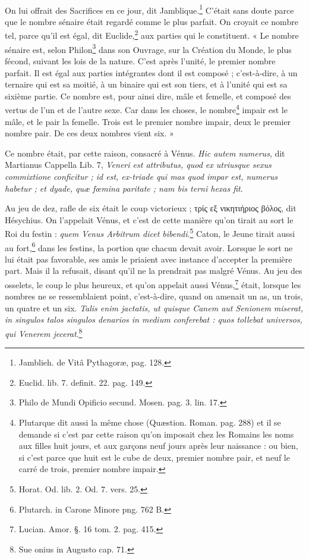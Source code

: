 \documentclass[a4paper, 11pt, oneside, polutonikogreek, french]{article}
\begin{document}
\paragraph{}
On lui offrait des Sacrifices en ce jour, dit Jamblique.\footnote{Jamblieh. de Vitâ Pythagoræ, pag. 128.} C'était sans doute parce que le nombre sénaire était regardé comme le plus parfait. On croyait ce nombre tel, parce qu'il est égal, dit Euclide,\footnote{Euclid. lib. 7. definit. 22. pag. 149.} aux parties qui le constituent. « Le nombre sénaire est, selon Philon\footnote{Philo de Mundi Opificio secund. Mosen. pag. 3. lin. 17.} dans son Ouvrage, sur la Création du Monde, le plus fécond, suivant les lois de la nature. C'est après l'unité, le premier nombre parfait. Il est égal aux parties intégrantes dont il est composé ; c'est-à-dire, à un ternaire qui est sa moitié, à un binaire qui est son tiers, et à l'unité qui est sa sixième partie. Ce nombre est, pour ainsi dire, mâle et femelle, et composé des vertus de l'un et de l'autre sexe. Car dans les choses, le nombre\footnote{Plutarque dit aussi la même chose (Quæstion. Roman. pag. 288) et il se demande si c'est par cette raison qu'on imposait chez les Romains les noms aux filles huit jours, et aux garçons neuf jours après leur naissance : ou bien, si c'est parce que huit est le cube de deux, premier nombre pair, et neuf le carré de trois, premier nombre impair.} impair est le mâle, et le pair la femelle. Trois est le premier nombre impair, deux le premier nombre pair. De ces deux nombres vient six. »

Ce nombre était, par cette raison, consacré à Vénus. \emph{Hic autem numerus}, dit Martianus Cappella Lib. 7, \emph{Veneri est attributus, quod ex utriusque sexus commixtione conficitur ; id est, ex-triade qui mas quod impar est, numerus habetur ; et dyade, quæ fœmina paritate ; nam bis terni hexas fit}.

Au jeu de dez, rafle de six était le coup victorieux ; τρίς εξ νικητιήριος βόλος, dit Hésychius. On l'appelait Vénus, et c'est de cette manière qu'on tirait au sort le Roi du festin : \emph{quem Venus Arbitrum dicet bibendi}.\footnote{Horat. Od. lib. 2. Od. 7. vers. 25.} Caton, le Jeune tirait aussi au fort,\footnote{Plutarch. in Carone Minore png. 762 B.} dans les festins, la portion que chacun devait avoir. Lorsque le sort ne lui était pas favorable, ses amis le priaient avec instance d'accepter la première part. Mais il la refusait, disant qu'il ne la prendrait pas malgré Vénus. Au jeu des osselets, le coup le plus heureux, et qu'on appelait aussi Vénus,\footnote{Lucian. Amor. §. 16 tom. 2. pag. 415.} était, lorsque les nombres ne se ressemblaient point, c'est-à-dire, quand on amenait un as, un trois, un quatre et un six. \emph{Talis enim jactatis, ut quisque Canem aut Senionem miserat, in singulos talos singulos denarios in medium conferebat : quos tollebat universos, qui Venerem jecerat}.\footnote{Sue onius in Augusto cap. 71.}
\end{document}
